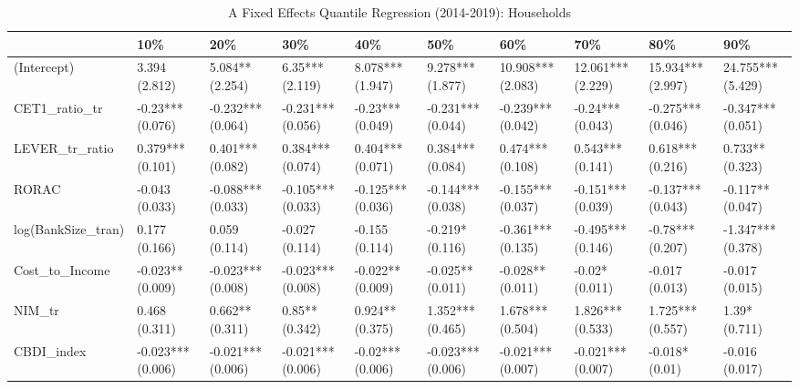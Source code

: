 \begin{table}[ht]
\centering
\caption{A Fixed Effects Quantile Regression (2014-2019): Households} 
\begingroup\small
\begin{tabular}{llllllllll}
  \toprule
 & 10\% & 20\% & 30\% & 40\% & 50\% & 60\% & 70\% & 80\% & 90\% \\ 
  \midrule
(Intercept) & 3.394 (2.812) & 5.084** (2.254) & 6.35*** (2.119) & 8.078*** (1.947) & 9.278*** (1.877) & 10.908*** (2.083) & 12.061*** (2.229) & 15.934*** (2.997) & 24.755*** (5.429) \\ 
  CET1\_ratio\_tr & -0.23*** (0.076) & -0.232*** (0.064) & -0.231*** (0.056) & -0.23*** (0.049) & -0.231*** (0.044) & -0.239*** (0.042) & -0.24*** (0.043) & -0.275*** (0.046) & -0.347*** (0.051) \\ 
  LEVER\_tr\_ratio & 0.379*** (0.101) & 0.401*** (0.082) & 0.384*** (0.074) & 0.404*** (0.071) & 0.384*** (0.084) & 0.474*** (0.108) & 0.543*** (0.141) & 0.618*** (0.216) & 0.733** (0.323) \\ 
  RORAC & -0.043 (0.033) & -0.088*** (0.033) & -0.105*** (0.033) & -0.125*** (0.036) & -0.144*** (0.038) & -0.155*** (0.037) & -0.151*** (0.039) & -0.137*** (0.043) & -0.117** (0.047) \\ 
  log(BankSize\_tran) & 0.177 (0.166) & 0.059 (0.114) & -0.027 (0.114) & -0.155 (0.114) & -0.219* (0.116) & -0.361*** (0.135) & -0.495*** (0.146) & -0.78*** (0.207) & -1.347*** (0.378) \\ 
  Cost\_to\_Income & -0.023** (0.009) & -0.023*** (0.008) & -0.023*** (0.008) & -0.022** (0.009) & -0.025** (0.011) & -0.028** (0.011) & -0.02* (0.011) & -0.017 (0.013) & -0.017 (0.015) \\ 
  NIM\_tr & 0.468 (0.311) & 0.662** (0.311) & 0.85** (0.342) & 0.924** (0.375) & 1.352*** (0.465) & 1.678*** (0.504) & 1.826*** (0.533) & 1.725*** (0.557) & 1.39* (0.711) \\ 
  CBDI\_index & -0.023*** (0.006) & -0.021*** (0.006) & -0.021*** (0.006) & -0.02*** (0.006) & -0.023*** (0.006) & -0.021*** (0.007) & -0.021*** (0.007) & -0.018* (0.01) & -0.016 (0.017) \\ 
   \bottomrule
\end{tabular}
\endgroup
\end{table}
